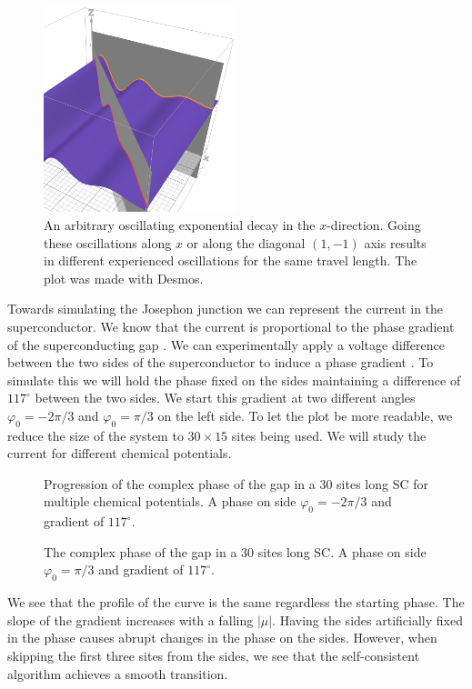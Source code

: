 \documentclass[..\main.tex]{subfile}
\begin{document}
\begin{figure}[H]
  \centering
  \includegraphics[width=0.5\textwidth]{Ressources/CooperPairsOrient.PNG}
  \caption{An arbitrary oscillating exponential decay in the $x$-direction. Going these oscillations along $x$ or along the diagonal $(1,-1)$ axis results in different
  experienced oscillations for the same travel length. The plot was made with Desmos.}
\end{figure}
Towards simulating the Josephon junction we can represent the current in the superconductor.
We know that the current is proportional to the phase gradient of the superconducting gap \cite{Orlando2003}.
We can experimentally apply a voltage difference between the two sides of the superconductor to induce a phase gradient \cite{Orlando2003}.
To simulate this we will hold the phase fixed on the sides maintaining a difference of $117^{\circ}$ between the two sides.
We start this gradient at two different angles $\varphi_0 = -2\pi/3$ and $\varphi_0 = \pi/3$ on the left side.
To let the plot be more readable, we reduce the size of the system to $30\times15$ sites being used.
We will study the current for different chemical potentials.
\begin{figure}[H]
    
    \caption{Progression of the complex phase of the gap in a 30 sites long SC for multiple chemical potentials.
     A phase on side $\varphi_0 = -2\pi/3$ and gradient of $117^{\circ}$.}
    \label{fig:Phase-2pi3}
\end{figure}
\begin{figure}[H]
    
    \caption{The complex phase of the gap in a 30 sites long SC. A phase on side $\varphi_0 = \pi/3$ and gradient of $117^{\circ}$.}
    \label{fig:Phasepi3}
\end{figure}
We see that the profile of the curve is the same regardless the starting phase. The slope of the gradient increases with a falling $|\mu|$.
Having the sides artificially fixed in the phase causes abrupt changes in the phase on the sides. However, when skipping the first
three sites from the sides, we see that the self-consistent algorithm achieves a smooth transition. 
\end{document}
